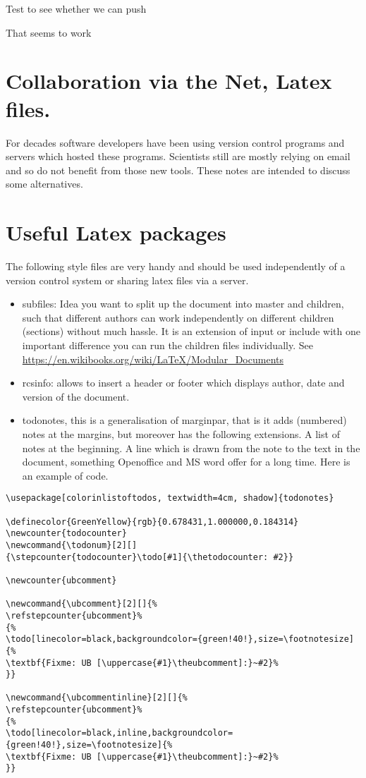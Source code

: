 \documentclass[11pt]{article}
\author{Uwe Brauer}
\date{\today}
\title{}
\begin{document}
\tableofcontents

Test to see whether we can push

That seems to work %
\section{Collaboration via the Net, Latex files.}
\label{sec:orgheadline1}

For decades software developers have been using version control
programs and servers which hosted these programs. Scientists still are
mostly relying on email and so do not benefit from those new tools.
These notes are intended to discuss some alternatives.

\section{Useful Latex packages}
\label{sec:orgheadline2}


The following style files  are very handy and should be used
independently of a version control system or sharing latex files via a
server. 


\begin{itemize}
\item subfiles: Idea you want to split up the document into master
and children, such that different authors can work
independently on different children (sections) without much
hassle. It is an extension of input or include with one
important difference you can run the children files
individually. See  \url{https://en.wikibooks.org/wiki/LaTeX/Modular_Documents}

\item rcsinfo: allows to insert a header or footer which displays
author, date and version of the document.

\item todonotes, this is a generalisation of marginpar, that is it
adds (numbered) notes at the margins, but moreover has  the
following extensions. A list of notes at the beginning. A line
which is drawn from the note to the text in the document,
something Openoffice and MS word offer for a long time. Here is
an example of code.
\end{itemize}

\begin{verbatim}
\usepackage[colorinlistoftodos, textwidth=4cm, shadow]{todonotes}

\definecolor{GreenYellow}{rgb}{0.678431,1.000000,0.184314}
\newcounter{todocounter}
\newcommand{\todonum}[2][]
{\stepcounter{todocounter}\todo[#1]{\thetodocounter: #2}}

\newcounter{ubcomment}

\newcommand{\ubcomment}[2][]{%
\refstepcounter{ubcomment}%
{%
\todo[linecolor=black,backgroundcolor={green!40!},size=\footnotesize]{%
\textbf{Fixme: UB [\uppercase{#1}\theubcomment]:}~#2}%
}}

\newcommand{\ubcommentinline}[2][]{%
\refstepcounter{ubcomment}%
{%
\todo[linecolor=black,inline,backgroundcolor={green!40!},size=\footnotesize]{%
\textbf{Fixme: UB [\uppercase{#1}\theubcomment]:}~#2}%
}}
\end{verbatim}
\end{document}
